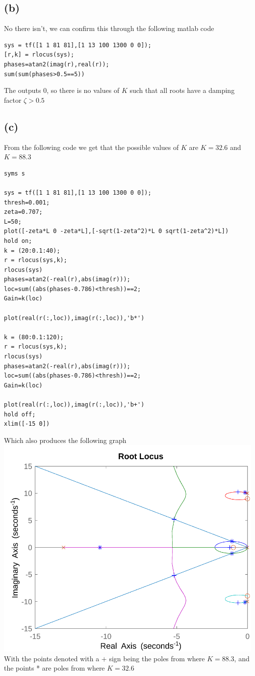 \documentclass[12pt]{article}
\begin{document}
\subsection*{(b)}
No there isn't, we can confirm this through the following matlab code
\begin{verbatim}
sys = tf([1 1 81 81],[1 13 100 1300 0 0]);
[r,k] = rlocus(sys);
phases=atan2(imag(r),real(r));
sum(sum(phases>0.5==5))
\end{verbatim}
The outputs 0, so there is no values of $K$ such that all roots have a damping factor $\zeta>0.5$
\subsection*{(c)}
From the following code we get that the possible values of $K$ are $K=32.6$ and $K=88.3$
\begin{verbatim}
syms s

sys = tf([1 1 81 81],[1 13 100 1300 0 0]);
thresh=0.001;
zeta=0.707;
L=50;
plot([-zeta*L 0 -zeta*L],[-sqrt(1-zeta^2)*L 0 sqrt(1-zeta^2)*L])
hold on;
k = (20:0.1:40);
r = rlocus(sys,k);
rlocus(sys)
phases=atan2(-real(r),abs(imag(r)));
loc=sum((abs(phases-0.786)<thresh))==2;
Gain=k(loc)

plot(real(r(:,loc)),imag(r(:,loc)),'b*')

k = (80:0.1:120);
r = rlocus(sys,k);
rlocus(sys)
phases=atan2(-real(r),abs(imag(r)));
loc=sum((abs(phases-0.786)<thresh))==2;
Gain=k(loc)

plot(real(r(:,loc)),imag(r(:,loc)),'b+')
hold off;
xlim([-15 0])
\end{verbatim}
Which also produces the following graph\\
\includegraphics[scale=0.25]{Problem2Fig2.png}\\
With the points denoted with a $+$ sign being the poles from where $K=88.3$, and the points * are poles from where $K=32.6$
\end{document}
